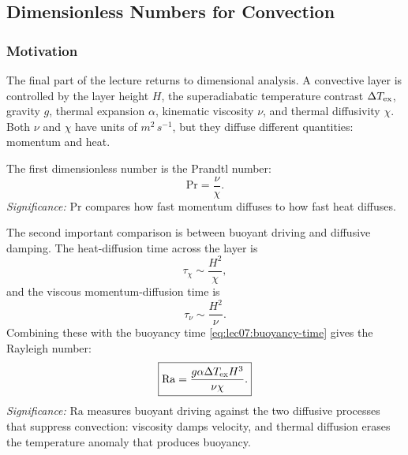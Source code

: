 \subsection{Dimensionless Numbers for Convection}
\label{sec:lec07:dimensionless-convection}

\subsubsection*{Motivation}
The final part of the lecture returns to dimensional analysis. A convective
layer is controlled by the layer height $H$, the superadiabatic temperature
contrast $\Delta T_{\rm ex}$, gravity $g$, thermal expansion $\alpha$,
kinematic viscosity $\nu$, and thermal diffusivity $\chi$. Both $\nu$ and
$\chi$ have units of $\si{m^2\,s^{-1}}$, but they diffuse different quantities:
momentum and heat.


The first dimensionless number is the Prandtl number:
\begin{equation}
    \boxed{
    \mathrm{Pr}=\frac{\nu}{\chi}.
    }
    \label{eq:lec07:prandtl}
\end{equation}
\textit{Significance:} $\mathrm{Pr}$ compares how fast momentum diffuses to
how fast heat diffuses.

The second important comparison is between buoyant driving and diffusive
damping. The heat-diffusion time across the layer is
\begin{equation}
    \tau_\chi \sim \frac{H^2}{\chi},
    \label{eq:lec07:thermal-diffusion-time}
\end{equation}
and the viscous momentum-diffusion time is
\begin{equation}
    \tau_\nu \sim \frac{H^2}{\nu}.
    \label{eq:lec07:viscous-diffusion-time}
\end{equation}
Combining these with the buoyancy time
\eqref{eq:lec07:buoyancy-time} gives the Rayleigh number:
\begin{equation}
    \boxed{
    \mathrm{Ra}
    = \frac{g\alpha\Delta T_{\rm ex}H^3}{\nu\chi}.
    }
    \label{eq:lec07:rayleigh}
\end{equation}
\textit{Significance:} $\mathrm{Ra}$ measures buoyant driving against the two
diffusive processes that suppress convection: viscosity damps velocity, and
thermal diffusion erases the temperature anomaly that produces buoyancy.

